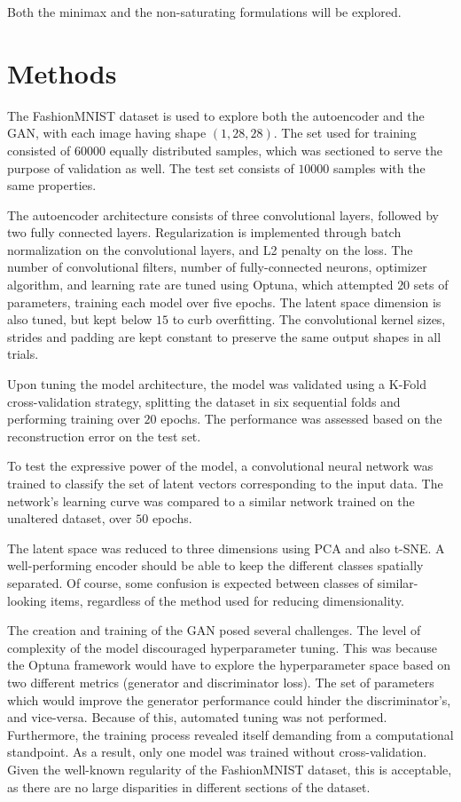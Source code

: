 \documentclass[11pt]{article} %
\begin{document}
Both the minimax and the non-saturating formulations will be explored.

\section*{Methods}

The FashionMNIST dataset is used to explore both the autoencoder and the GAN, with each image having shape $\left(1, 28, 28\right)$. The set used for training consisted of $60000$ equally distributed samples, which was sectioned to serve the purpose of validation as well. The test set consists of $10000$ samples with the same properties. 
 
The autoencoder architecture consists of three convolutional layers, followed by two fully connected layers. Regularization is implemented through batch normalization on the convolutional layers, and L2 penalty on the loss. The number of convolutional filters, number of fully-connected neurons, optimizer algorithm, and learning rate are tuned using Optuna, which attempted $20$ sets of parameters, training each model over five epochs. The latent space dimension is also tuned, but kept below $15$ to curb overfitting. The convolutional kernel sizes, strides and padding are kept constant to preserve the same output shapes in all trials.

\noindent Upon tuning the model architecture, the model was validated using a K-Fold cross-validation strategy, splitting the dataset in six sequential folds and performing training over $20$ epochs. The performance was assessed based on the reconstruction error on the test set.

\noindent To test the expressive power of the model, a convolutional neural network was trained to classify the set of latent vectors corresponding to the input data. The network's learning curve was compared to a similar network trained on the unaltered dataset, over $50$ epochs.

\noindent The latent space was reduced to three dimensions using PCA and also t-SNE. A well-performing encoder should be able to keep the different classes spatially separated. Of course, some confusion is expected between classes of similar-looking items, regardless of the method used for reducing dimensionality. 

\noindent The creation and training of the GAN posed several challenges. The level of complexity of the model discouraged hyperparameter tuning. This was because the Optuna framework would have to explore the hyperparameter space based on two different metrics (generator and discriminator loss). The set of parameters which would improve the generator performance could hinder the discriminator's, and vice-versa. Because of this, automated tuning was not performed. Furthermore, the training process revealed itself demanding from a computational standpoint. As a result, only one model was trained without cross-validation. Given the well-known regularity of the FashionMNIST dataset, this is acceptable, as there are no large disparities in different sections of the dataset.
\end{document}
